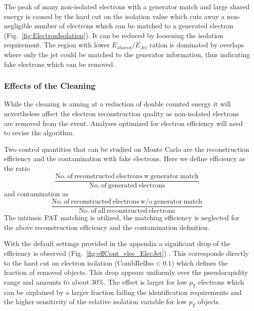\documentclass{cmspaper}
\begin{document}
The peak of many non-isolated electrons with a generator match and large shared
energy is caused by the hard cut on the isolation value which cuts away a
non-negligible number of electrons which can be matched to a generated electron
(Fig.~\ref{fig:ElectronIsolation}). It can be reduced by loosening the
isolation requirement.
The region with lower $E_{shared}/E_{Jet}$ ration is dominated by overlaps
where only the jet could be matched to the generator information, thus
indicating fake electrons which can be removed.


\clearpage

\subsubsection{Effects of the Cleaning}
While the cleaning is aiming at a reduction of double counted energy it will
nevertheless affect the electron reconstruction quality as non-isolated
electrons are removed from the event. Analyses optimized for electron efficiency
will need to revise the algorithm.

Two control quantities that can be
studied on Monte Carlo are the reconstruction efficiency and the contamination
with fake electrons. Here we define efficiency as the ratio 
\[\frac{\mathrm{No.\ of\ reconstructed\ electrons\ w\ generator\ match}}{\mathrm{No.\ of\ generated\ electrons}}\]
and contamination as
\[\frac{\mathrm{No.\ of\ reconstructed\ electrons\ w/o\ generator\ match
}}{\mathrm{No.\ of\ all\ reconstructed\ electrons}}\]
The intrinsic PAT matching is utilized, the matching efficiency is neglected for
the above reconstruction efficiency and the contamination definition.

With the default settings provided in the appendix a significant drop of the
efficiency is observed (Fig.~\ref{fig:effCont_elec_ElecJet}) . This
corresponds directly to the hard cut on electron isolation
($\mathrm{CombRelIso}<0.1$) which defines the fraction of removed objects. This
drop appears uniformly over the pseudorapidity range and amounts to
about 30\%.  The effect is larger for low $p_T$ electrons which can be
explained by a larger fraction failing the identification requirements and the
higher sensitivity of the relative isolation variable for low $p_T$ objects.
\end{document}
